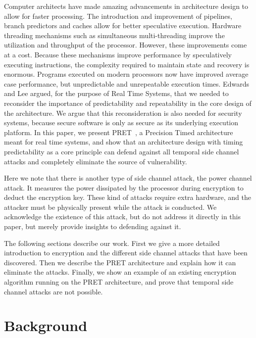 \documentclass[times, 10pt,twocolumn]{article}
\begin{document}
Computer architects have made amazing advancements in architecture design to allow for faster processing. The introduction and improvement of pipelines, branch predictors and caches allow for better speculative execution. Hardware threading mechanisms such as simultaneous multi-threading improve the utilization and throughput of the processor. However, these improvements come at a cost. Because these mechanisms improve performance by speculatively executing instructions, the complexity required to maintain state and recovery is enormous. Programs executed on modern processors now have improved average case performance, but unpredictable and unrepeatable execution times. Edwards and Lee\cite{edwards2007case} argued, for the purpose of Real Time Systems, that we needed to reconsider the importance of predictability and repeatability in the core design of the architecture. We argue that this reconsideration is also needed for security systems, because secure software is only as secure as its underlying execution platform. In this paper, we present PRET~\cite{pret_cases08}, a Precision Timed architecture meant for real time systems, and show that an architecture design with timing predictability as a core principle can defend against all temporal side channel attacks and completely eliminate the source of vulnerability.    

Here we note that there is another type of side channel attack, the power channel attack. It measures the power dissipated by the processor during encryption to deduct the encryption key. These kind of attacks require extra hardware, and the attacker must be physically present while the attack is conducted. We acknowledge the existence of this attack, but do not address it directly in this paper, but merely provide insights to defending against it.
   
The following sections describe our work. First we give a more detailed introduction to encryption and the different side channel attacks that have been discovered. Then we describe the PRET architecture and explain how it can eliminate the attacks. Finally, we show an example of an existing encryption algorithm running on the PRET architecture, and prove that temporal side channel attacks are not possible.
\section{Background}
\end{document}
